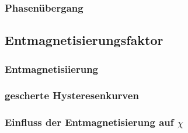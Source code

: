         \subsubsection*{Phasenübergang}

    \subsection{Entmagnetisierungsfaktor}

        \subsubsection*{Entmagnetisiierung}

        \subsubsection*{gescherte Hysteresenkurven}

        \subsubsection*{Einfluss der Entmagnetisierung auf $\chi$}

            
